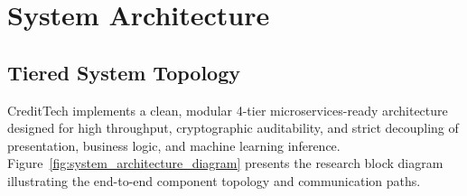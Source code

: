 \documentclass[11pt,a4paper,oneside]{report}
\begin{document}



\chapter{System Architecture}
\label{chap:system_architecture}

\section{Tiered System Topology}
CreditTech implements a clean, modular 4-tier microservices-ready architecture designed for high throughput, cryptographic auditability, and strict decoupling of presentation, business logic, and machine learning inference. Figure~\ref{fig:system_architecture_diagram} presents the research block diagram illustrating the end-to-end component topology and communication paths.
\end{document}
